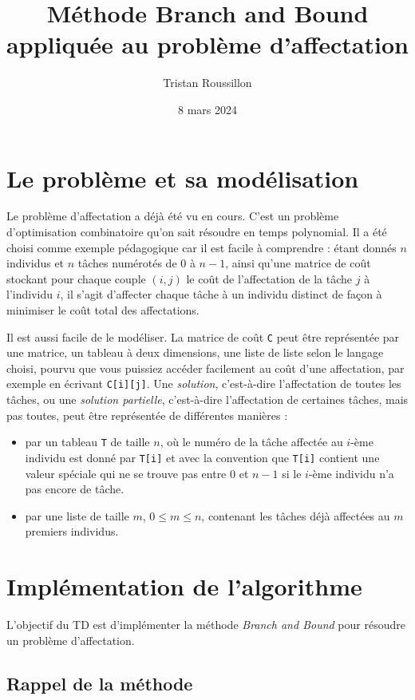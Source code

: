 \documentclass[a4paper,francais]{article}
\title{Méthode Branch and Bound appliquée au problème d'affectation}
\author{Tristan Roussillon}
\date{8 mars 2024}
\theoremstyle{definition}
\begin{document}
\maketitle

\section{Le problème et sa modélisation}

Le problème d'affectation a déjà été vu en cours. C'est un problème
d'optimisation combinatoire qu'on sait résoudre en temps polynomial.
Il a été choisi comme exemple pédagogique car il est facile à comprendre :
étant donnés $n$ individus et $n$ tâches numérotés de $0$ à $n-1$,
ainsi qu'une matrice de coût stockant pour chaque
couple $(i,j)$ le coût de l'affectation de la tâche $j$ à l'individu $i$,
il s'agit d'affecter chaque tâche à un individu distinct de façon à minimiser
le coût total des affectations.

Il est aussi facile de le modéliser. 
La matrice de coût \verb+C+ peut être représentée par une matrice,
un tableau à deux dimensions, une liste de liste selon le langage choisi,
pourvu que vous puissiez accéder facilement au coût d'une affectation,
par exemple en écrivant \verb+C[i][j]+. Une \emph{solution}, c'est-à-dire
l'affectation de toutes les tâches, ou une \emph{solution partielle},
c'est-à-dire l'affectation de certaines tâches, mais pas toutes, peut
être représentée de différentes manières : 
\begin{itemize}
\item par un tableau \verb+T+ de taille $n$, où le numéro de la tâche
  affectée au $i$-ème individu est donné par \verb+T[i]+ et avec la
  convention que \verb+T[i]+ contient une valeur spéciale qui ne se trouve
  pas entre $0$ et $n-1$ si le $i$-ème individu n'a pas encore de tâche.
\item par une liste de taille $m$, $0 \leq m \leq n$, contenant les tâches
  déjà affectées au $m$ premiers individus. 
\end{itemize}

\section{Implémentation de l'algorithme}

L'objectif du TD est d'implémenter la méthode \emph{Branch and Bound}
pour résoudre un problème d'affectation. 

\subsection{Rappel de la méthode}
\end{document}
